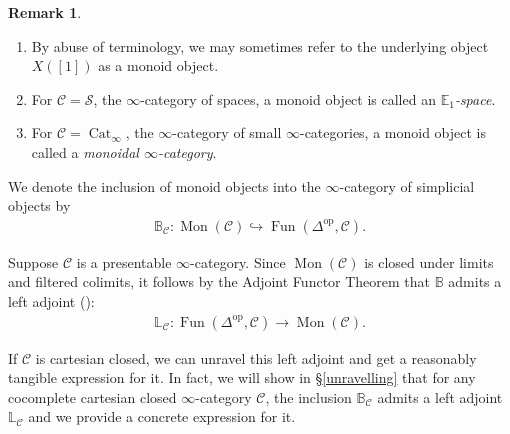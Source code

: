 \documentclass[12pt, reqno]{amsart}
\theoremstyle{plain}
\theoremstyle{definition}
\newtheorem{remark}[theorem]{Remark}
\begin{document}
\begin{remark} \ 
\begin{enumerate}
\item By abuse of terminology, we may sometimes refer to the underlying object $X([1])$ as a monoid object.
\item For $\mathcal{C}=\mathcal{S}$, the $\infty$-category of spaces, a monoid object is called an \textit{$\mathbb{E}_1$-space}.
\item For $\mathcal{C}=\operatorname{Cat}_\infty$, the $\infty$-category of small $\infty$-categories, a monoid object is called a \textit{monoidal $\infty$-category}.\qedhere
\end{enumerate}
\end{remark}

We denote the inclusion of monoid objects into the $\infty$-category of simplicial objects by
\begin{align*}
\mathbb{B}_\mathcal{C}\colon \operatorname{Mon}(\mathcal{C})\hookrightarrow \operatorname{Fun}(\Delta^{\operatorname{op}},\mathcal{C}).
\end{align*}

Suppose $\mathcal{C}$ is a presentable $\infty$-category. Since $\operatorname{Mon}(\mathcal{C})$ is closed under limits and filtered colimits, it follows by the Adjoint Functor Theorem that $\mathbb{B}$ admits a left adjoint (\cite[Corollary 5.5.2.9]{LurieHTT}):
\begin{align*}
\mathbb{L}_\mathcal{C}\colon \operatorname{Fun}(\Delta^{\operatorname{op}},\mathcal{C})\rightarrow \operatorname{Mon}(\mathcal{C}).
\end{align*}

If $\mathcal{C}$ is cartesian closed, we can unravel this left adjoint and get a reasonably tangible expression for it. In fact, we will show in \S \ref{unravelling} that for any cocomplete cartesian closed $\infty$-category $\mathcal{C}$, the inclusion $\mathbb{B}_\mathcal{C}$ admits a left adjoint $\mathbb{L}_\mathcal{C}$ and we provide a concrete expression for it.
\end{document}
